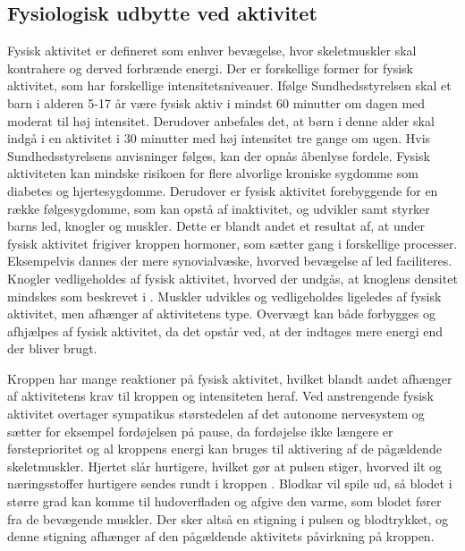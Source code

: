\subsection{Fysiologisk udbytte ved aktivitet}\label{subsec:fysio_aktivitet}
Fysisk aktivitet er defineret som enhver bevægelse, hvor skeletmuskler skal kontrahere og derved forbrænde energi. Der er forskellige former for fysisk aktivitet, som har forskellige intensitetsniveauer. \citep{Academic2016a} Ifølge Sundhedsstyrelsen skal et barn i alderen 5-17 år være fysisk aktiv i mindst 60 minutter om dagen med moderat til høj intensitet. Derudover anbefales det, at børn i denne alder skal indgå i en aktivitet i 30 minutter med høj intensitet tre gange om ugen. \citep{Sundhedsstyrelsen2016} Hvis Sundhedsstyrelsens anvisninger følges, kan der opnås åbenlyse fordele. Fysisk aktiviteten kan mindske risikoen for flere alvorlige kroniske sygdomme som diabetes og hjertesygdomme. Derudover er fysisk aktivitet forebyggende for en række følgesygdomme, som kan opstå af inaktivitet, og udvikler samt styrker barns led, knogler og muskler. Dette er blandt andet et resultat af, at under fysisk aktivitet frigiver kroppen hormoner, som sætter gang i forskellige processer. Eksempelvis dannes der mere synovialvæske, hvorved bevægelse af led faciliteres. Knogler vedligeholdes af fysisk aktivitet, hvorved der undgås, at knoglens densitet mindskes som beskrevet i . Muskler udvikles og vedligeholdes ligeledes af fysisk aktivitet, men afhænger af aktivitetens type. Overvægt kan både forbygges og afhjælpes af fysisk aktivitet, da det opstår ved, at der indtages mere energi end der bliver brugt. %
\citep{Academic2016a,Smith1991,Academic2016b,Cotman2007,CenterforDiseaseControlandPrevention2015}

Kroppen har mange reaktioner på fysisk aktivitet, hvilket blandt andet afhænger af aktivitetens krav til kroppen og intensiteten heraf. Ved anstrengende fysisk aktivitet overtager sympatikus størstedelen af det autonome nervesystem og sætter for eksempel fordøjelsen på pause, da fordøjelse ikke længere er førsteprioritet og al kroppens energi kan bruges til aktivering af de pågældende skeletmuskler. Hjertet slår hurtigere, hvilket gør at pulsen stiger, hvorved ilt og næringsstoffer hurtigere sendes rundt i kroppen \citep{Hjerteforeningen}. Blodkar vil spile ud, så blodet i større grad kan komme til hudoverfladen og afgive den varme, som blodet fører fra de bevægende muskler. Der sker altså en stigning i pulsen og blodtrykket, og denne stigning afhænger af den pågældende aktivitets påvirkning på kroppen. \citep{Martini2012,Stanfield2013,Berchtold2010}

